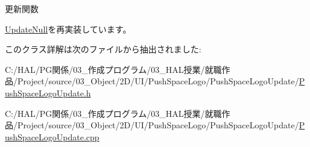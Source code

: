 更新関数 



\mbox{\hyperlink{class_update_null_a692f4f34e4ef35ca286a1d3606fdf473}{Update\+Null}}を再実装しています。



このクラス詳解は次のファイルから抽出されました\+:\begin{DoxyCompactItemize}
\item 
C\+:/\+H\+A\+L/\+P\+G関係/03\+\_\+作成プログラム/03\+\_\+\+H\+A\+L授業/就職作品/\+Project/source/03\+\_\+\+Object/2\+D/\+U\+I/\+Push\+Space\+Logo/\+Push\+Space\+Logo\+Update/\mbox{\hyperlink{_push_space_logo_update_8h}{Push\+Space\+Logo\+Update.\+h}}\item 
C\+:/\+H\+A\+L/\+P\+G関係/03\+\_\+作成プログラム/03\+\_\+\+H\+A\+L授業/就職作品/\+Project/source/03\+\_\+\+Object/2\+D/\+U\+I/\+Push\+Space\+Logo/\+Push\+Space\+Logo\+Update/\mbox{\hyperlink{_push_space_logo_update_8cpp}{Push\+Space\+Logo\+Update.\+cpp}}\end{DoxyCompactItemize}
